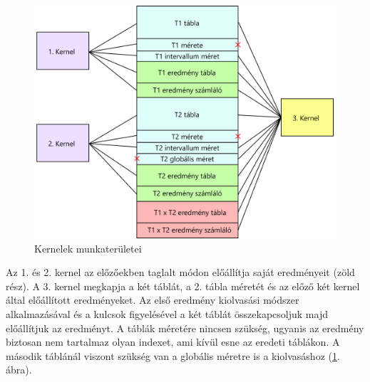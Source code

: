 \begin{figure}[h!]
\centering
\includegraphics[width=12cm]{images/join_kernels.png}
\caption{Kernelek munkaterületei }
\label{fig:join_kernels}
\end{figure}

Az 1. és 2. kernel az előzőekben taglalt módon előállítja saját eredményeit (zöld rész). 
A 3. kernel megkapja a két táblát, a 2. tábla méretét és az előző két kernel által előállított eredményeket.
Az első eredmény kiolvasási módszer alkalmazásával és a kulcsok figyelésével a két táblát összekapcsoljuk majd előállítjuk az eredményt.
A táblák méretére nincsen szükség, ugyanis az eredmény biztosan nem tartalmaz olyan indexet, ami kívül esne az eredeti táblákon. A második táblánál viszont szükség van a globális méretre is a kiolvasáshoz (\ref{fig:join_kernels}. ábra).
